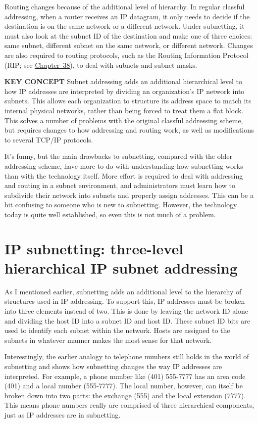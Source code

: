 Routing changes because of the additional level of hierarchy. In regular
classful addressing, when a router receives an IP datagram, it only
needs to decide if the destination is on the same network or a different
network. Under subnetting, it must also look at the subnet ID of the
destination and make one of three choices: same subnet, different subnet
on the same network, or different network. Changes are also required to
routing protocols, such as the Routing Information Protocol (RIP; see
\protect\hyperlink{ch38.html}{Chapter~38}), to deal with subnets and
subnet masks.


{\textbf{KEY CONCEPT}} Subnet addressing adds an additional hierarchical
level to how IP addresses are interpreted by dividing an organization's
IP network into subnets. This allows each organization to structure its
address space to match its internal physical networks, rather than being
forced to treat them a flat block. This solves a number of problems with
the original classful addressing scheme, but requires changes to how
addressing and routing work, as well as modifications to several TCP/IP
protocols.

It's funny, but the main drawbacks to subnetting, compared with the
older addressing scheme, have more to do with understanding how
subnetting works than with the technology itself. More effort is
required to deal with addressing and routing in a subnet environment,
and administrators must learn how to subdivide their network into
subnets and properly assign addresses. This can be a bit confusing to
someone who is new to subnetting. However, the technology today is quite
well established, so even this is not much of a problem.


\section{IP subnetting: three-level hierarchical IP subnet addressing}

As I mentioned earlier, subnetting adds an additional level to the hierarchy
of structures used in IP addressing. To support this, IP addresses must
be broken into three elements instead of two. This is done by leaving
the network ID alone and dividing the host ID into a subnet ID and host
ID. These subnet ID bits are used to identify each subnet within the
network. Hosts are assigned to the subnets in whatever manner makes the
most sense for that network.

Interestingly, the earlier analogy to telephone numbers still holds in
the world of subnetting and shows how subnetting changes the way IP
addresses are interpreted. For example, a phone number like (401)
555-7777 has an area code (401) and a local number (555-7777). The local
number, however, can itself be broken down into two parts: the exchange
(555) and the local extension (7777). This means phone numbers really
are comprised of three hierarchical components, just as IP addresses are
in subnetting.

